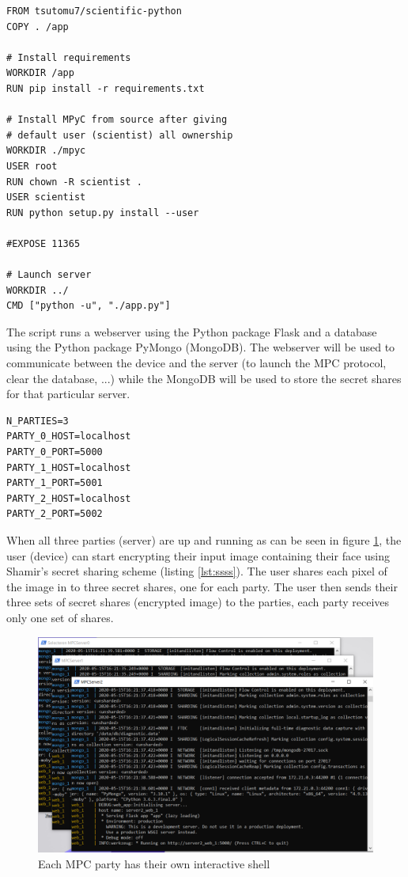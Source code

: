 \begin{lstlisting}[caption={Docker files for servers}, label={lst:docker}, frame=single]
FROM tsutomu7/scientific-python
COPY . /app

# Install requirements
WORKDIR /app
RUN pip install -r requirements.txt

# Install MPyC from source after giving
# default user (scientist) all ownership
WORKDIR ./mpyc
USER root
RUN chown -R scientist .
USER scientist
RUN python setup.py install --user

#EXPOSE 11365

# Launch server
WORKDIR ../
CMD ["python -u", "./app.py"]
\end{lstlisting}

The  script runs a webserver using the Python package Flask and a database using the Python package PyMongo (MongoDB). The webserver will be used to communicate between the device and the server (to launch the MPC protocol, clear the database, ...) while the MongoDB will be used to store the secret shares for that particular server.

\begin{lstlisting}[caption={Environment file for servers}, label={lst:env}, frame=single]
N_PARTIES=3
PARTY_0_HOST=localhost
PARTY_0_PORT=5000
PARTY_1_HOST=localhost
PARTY_1_PORT=5001
PARTY_2_HOST=localhost
PARTY_2_PORT=5002
\end{lstlisting}

When all three parties (server) are up and running as can be seen in figure \ref{fig:mpc_shells}, the user (device) can start encrypting their input image containing their face using Shamir's secret sharing scheme (listing \ref{lst:ssss}). The user shares each pixel of the image in to three secret shares, one for each party. The user then sends their three sets of secret shares (encrypted image) to the parties, each party receives only one set of shares.

\begin{figure}[H]
  \includegraphics[scale=0.5]{fig/mpc_shells.png}
  \centering
  \caption{Each MPC party has their own interactive shell}
  \label{fig:mpc_shells}
\end{figure}

